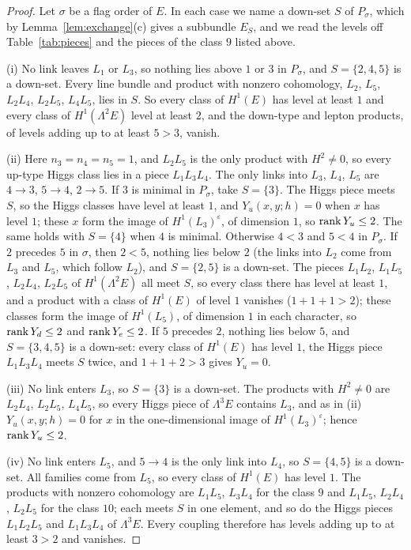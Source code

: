 \begin{proof}
Let $\sigma$ be a flag order of $E$. In each case we name a down-set $S$ of
$P_\sigma$, which by Lemma~\ref{lem:exchange}(c) gives a subbundle $E_S$,
and we read the levels off Table~\ref{tab:pieces} and the pieces of the
class $9$ listed above.

(i) No link leaves $L_1$ or $L_3$, so nothing lies above $1$ or $3$ in
$P_\sigma$, and $S=\{2,4,5\}$ is a down-set. Every line bundle and product
with nonzero cohomology, $L_2$, $L_5$, $L_2L_4$, $L_2L_5$, $L_4L_5$, lies
in $S$. So every class of $H^1(E)$ has level at least $1$ and every class
of $H^1(\Lambda^2E)$ level at least $2$, and the down-type and lepton
products, of levels adding up to at least $5>3$, vanish.

(ii) Here $n_3=n_4=n_5=1$, and $L_2L_5$ is the only product with
$H^2\ne0$, so every up-type Higgs class lies in a piece $L_1L_3L_4$. The
only links into $L_3$, $L_4$, $L_5$ are $4\to3$, $5\to4$, $2\to5$. If $3$
is minimal in $P_\sigma$, take $S=\{3\}$. The Higgs piece meets $S$, so
the Higgs classes have level at least $1$, and $Y_u(x,y;h)=0$ when $x$ has
level $1$; these $x$ form the image of $H^1(L_3)^\varepsilon$, of
dimension $1$, so $\operatorname{rank} Y_u\le2$. The same holds with $S=\{4\}$ when $4$ is
minimal. Otherwise $4<3$ and $5<4$ in $P_\sigma$. If $2$ precedes $5$ in
$\sigma$, then $2<5$, nothing lies below $2$ (the links into $L_2$ come
from $L_3$ and $L_5$, which follow $L_2$), and $S=\{2,5\}$ is a down-set.
The pieces $L_1L_2$, $L_1L_5$, $L_2L_4$, $L_2L_5$ of $H^1(\Lambda^2E)$ all
meet $S$, so every class there has level at least $1$, and a product with
a class of $H^1(E)$ of level $1$ vanishes ($1+1+1>2$); these classes form
the image of $H^1(L_5)$, of dimension $1$ in each character, so $\operatorname{rank}
Y_d\le2$ and $\operatorname{rank} Y_e\le2$. If $5$ precedes $2$, nothing lies below $5$,
and $S=\{3,4,5\}$ is a down-set: every class of $H^1(E)$ has level $1$, the
Higgs piece $L_1L_3L_4$ meets $S$ twice, and $1+1+2>3$ gives $Y_u=0$.

(iii) No link enters $L_3$, so $S=\{3\}$ is a down-set. The products with
$H^2\ne0$ are $L_2L_4$, $L_2L_5$, $L_4L_5$, so every Higgs piece of
$\Lambda^3E$ contains $L_3$, and as in (ii) $Y_u(x,y;h)=0$ for $x$ in the
one-dimensional image of $H^1(L_3)^\varepsilon$; hence $\operatorname{rank} Y_u\le2$.

(iv) No link enters $L_5$, and $5\to4$ is the only link into $L_4$, so
$S=\{4,5\}$ is a down-set. All families come from $L_5$, so every class of
$H^1(E)$ has level $1$. The products with nonzero cohomology are
$L_1L_5$, $L_3L_4$ for the class $9$ and $L_1L_5$, $L_2L_4$, $L_2L_5$ for
the class $10$; each meets $S$ in one element, and so do the Higgs pieces
$L_1L_2L_5$ and $L_1L_3L_4$ of $\Lambda^3E$. Every coupling therefore has
levels adding up to at least $3>2$ and vanishes.
\end{proof}

